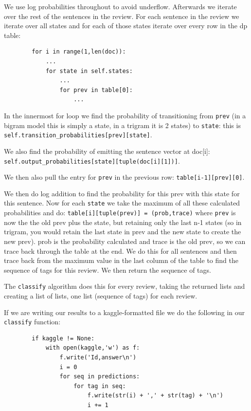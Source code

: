 \documentclass{article}
\begin{document}
We use log probabilities throughout to avoid underflow. Afterwards we iterate over the rest of the sentences in the review. For each sentence in the review we iterate over all states and for each of those states iterate over every row in the dp table:
\begin{verbatim}
        for i in range(1,len(doc)):
            ...
            for state in self.states:
                ...
                for prev in table[0]:
                    ...
\end{verbatim}

In the innermost for loop we find the probability of transitioning from \texttt{prev} (in a bigram model this is simply a state, in a trigram it is 2 states) to \texttt{state}: this is \texttt{self.transition\_probabilities[prev][state]}.\par
We also find the probability of emitting the sentence vector at doc[i]:\\
\texttt{self.output\_probabilities[state][tuple(doc[i][1])]}.\par

We then also pull the entry for \texttt{prev} in the previous row: \texttt{table[i-1][prev][0]}.\par

We then do log addition to find the probability for this prev with this state for this sentence. Now for each \texttt{state} we take the maximum of all these calculated probabilities and do: \texttt{table[i][tuple(prev)] = (prob,trace)} where \texttt{prev} is now the the old prev plus the state, but retaining only the last n-1 states (so in trigram, you would retain the last state in prev and the new state to create the new prev). prob is the probability calculated and trace is the old prev, so we can trace back through the table at the end. We do this for all sentences and then trace back from the maximum value in the last column of the table to find the sequence of tags for this review. We then return the sequence of tags. 

The \texttt{classify} algorithm does this for every review, taking the returned lists and creating a list of lists, one list (sequence of tags) for each review. 

If we are writing our results to a kaggle-formatted file we do the following in our \texttt{classify} function: 
\begin{verbatim}
        if kaggle != None:
            with open(kaggle,'w') as f:
                f.write('Id,answer\n')
                i = 0
                for seq in predictions:
                    for tag in seq:
                        f.write(str(i) + ',' + str(tag) + '\n')
                        i += 1
\end{verbatim}
\end{document}
